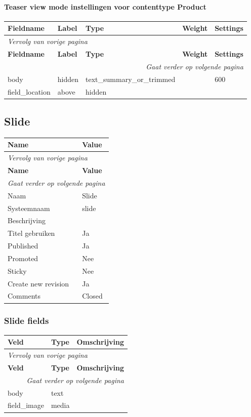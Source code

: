 \paragraph{Teaser view mode instellingen voor contenttype Product }

  \begin{longtable}{| p{3.00cm}|p{3.00cm}|p{3.00cm}|p{3.00cm}|p{3.00cm}|}
  \hline
  \rowcolor{tableheader}
  \textbf{Fieldname} & \textbf{Label} & \textbf{Type} & \textbf{Weight} & \textbf{Settings}  \tabularnewline
  \hline
\endfirsthead
\multicolumn{5}{l}{\textit{Vervolg van vorige pagina}} \\
\hline
\rowcolor{tableheader}
  \textbf{Fieldname} & \textbf{Label} & \textbf{Type} & \textbf{Weight} & \textbf{Settings}  \tabularnewline
  \hline
\hline
\endhead
\multicolumn{5}{r}{\textit{Gaat verder op volgende pagina}} \\
\endfoot
\hline
\endlastfoot
  body & hidden & text\_summary\_or\_trimmed &   & 600  \tabularnewline
  \hline
  field\_location & above & hidden &   &    \tabularnewline
  \hline
  \end{longtable}

\subsection{Slide}
\label{sec:content-slide}
  \begin{longtable}{| p{7.50cm}|p{7.50cm}|}
  \hline
  \rowcolor{tableheader}
  \textbf{Name} & \textbf{Value}  \tabularnewline
  \hline
\endfirsthead
\multicolumn{2}{l}{\textit{Vervolg van vorige pagina}} \\
\hline
\rowcolor{tableheader}
  \textbf{Name} & \textbf{Value}  \tabularnewline
  \hline
\hline
\endhead
\multicolumn{2}{r}{\textit{Gaat verder op volgende pagina}} \\
\endfoot
\hline
\endlastfoot
  Naam & Slide  \tabularnewline
  \hline
  Systeemnaam & slide  \tabularnewline
  \hline
  Beschrijving &   \tabularnewline
  \hline
  Titel gebruiken & Ja  \tabularnewline
  \hline
  Published & Ja  \tabularnewline
  \hline
  Promoted & Nee  \tabularnewline
  \hline
  Sticky & Nee  \tabularnewline
  \hline
  Create new revision & Ja  \tabularnewline
  \hline
  Comments & Closed  \tabularnewline
  \hline
  \end{longtable}

\subsubsection{Slide fields}
  \begin{longtable}{| p{5.00cm}|p{5.00cm}|p{5.00cm}|}
  \hline
  \rowcolor{tableheader}
  \textbf{Veld} & \textbf{Type} & \textbf{Omschrijving}  \tabularnewline
  \hline
\endfirsthead
\multicolumn{3}{l}{\textit{Vervolg van vorige pagina}} \\
\hline
\rowcolor{tableheader}
  \textbf{Veld} & \textbf{Type} & \textbf{Omschrijving}  \tabularnewline
  \hline
\hline
\endhead
\multicolumn{3}{r}{\textit{Gaat verder op volgende pagina}} \\
\endfoot
\hline
\endlastfoot
  body & text &   \tabularnewline
  \hline
  field\_image & media &   \tabularnewline
  \hline
  \end{longtable}

